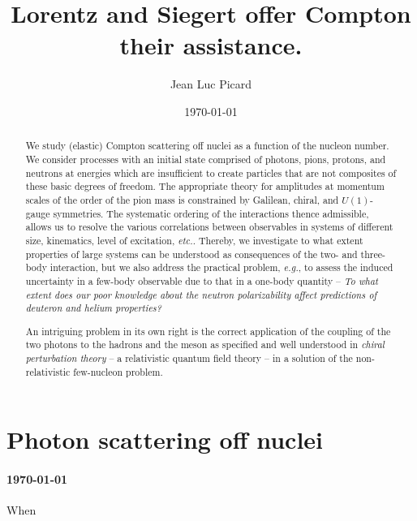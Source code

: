 \documentclass[onecolumn,preprint,superscriptaddress,nofootinbib,notitlepage,10pt,linenumbers]{revtex4-1}
\newcommand{\eg}{\textit{e.g.}\;}
\newcommand{\la}{\label}
\begin{document}
\title{Lorentz and Siegert offer Compton their assistance.}
\author{Jean Luc Picard}
\date{\today}

\begin{abstract}
We study (elastic) Compton scattering off nuclei as a function of the
nucleon number. We consider processes with an initial state comprised of
photons, pions, protons, and neutrons at energies which are insufficient to
create particles that are not composites of these basic degrees of freedom.
The appropriate theory for amplitudes at momentum scales of the order of the pion mass
is constrained by Galilean, chiral, and $U(1)$-gauge symmetries.
The systematic ordering of the interactions thence admissible, allows us to
resolve the various correlations between observables in systems of different
size, kinematics, level of excitation, {\it etc.}. Thereby, we investigate to what
extent properties of large systems can be understood as consequences of the
two- and three-body interaction, but we also address the practical problem, \eg,
to assess the induced uncertainty in a few-body observable due to that in a
one-body quantity -- {\it To what extent does our poor knowledge about the neutron
polarizability affect predictions of deuteron and helium properties?}

An intriguing problem in its own right is the correct application of the
coupling of the two photons to the hadrons and the meson as specified and well
understood in {\it chiral perturbation theory} -- a relativistic quantum field theory --
in a solution of the non-relativistic few-nucleon problem.
\end{abstract}



\section{Photon scattering off nuclei}

\paragraph{\today}When
\end{document}
